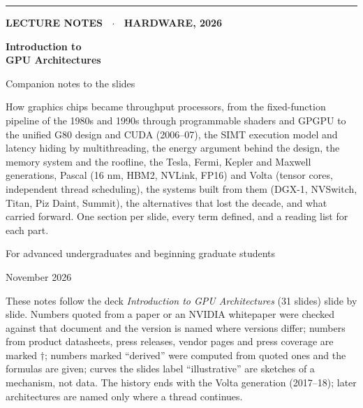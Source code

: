 \documentclass[11pt,letterpaper]{article}
\begin{document}
\begin{titlepage}
\thispagestyle{empty}
\vspace*{2.5cm}
{\color{attn}\rule{3cm}{3pt}}\par\vspace{0.6cm}
{\sffamily\bfseries\color{muted}\large LECTURE NOTES \ $\cdot$ \ HARDWARE, 2026\par}
\vspace{0.4cm}
{\sffamily\bfseries\fontsize{30}{34}\selectfont\color{ink} Introduction to\\GPU Architectures\par}
\vspace{0.3cm}
{\sffamily\fontsize{18}{22}\selectfont\color{ink} Companion notes to the slides\par}
\vspace{1.2cm}
{\large\color{muted}\parbox{0.82\textwidth}{How graphics chips became throughput processors, from the fixed-function pipeline of the 1980s and 1990s through programmable shaders and GPGPU to the unified G80 design and CUDA (2006--07), the SIMT execution model and latency hiding by multithreading, the energy argument behind the design, the memory system and the roofline, the Tesla, Fermi, Kepler and Maxwell generations, Pascal (16 nm, HBM2, NVLink, FP16) and Volta (tensor cores, independent thread scheduling), the systems built from them (DGX-1, NVSwitch, Titan, Piz Daint, Summit), the alternatives that lost the decade, and what carried forward. One section per slide, every term defined, and a reading list for each part.}\par}
\vspace{1.5cm}
{\color{muted}For advanced undergraduates and beginning graduate students\par}
\vspace{0.3cm}
{\color{muted}November 2026\par}
\vfill
{\small\color{muted}\parbox{0.9\textwidth}{These notes follow the deck \textit{Introduction to GPU Architectures} (31 slides) slide by slide. Numbers quoted from a paper or an NVIDIA whitepaper were checked against that document and the version is named where versions differ; numbers from product datasheets, press releases, vendor pages and press coverage are marked $\dagger$; numbers marked ``derived'' were computed from quoted ones and the formulas are given; curves the slides label ``illustrative'' are sketches of a mechanism, not data. The history ends with the Volta generation (2017--18); later architectures are named only where a thread continues.}\par}
\end{titlepage}
\end{document}
